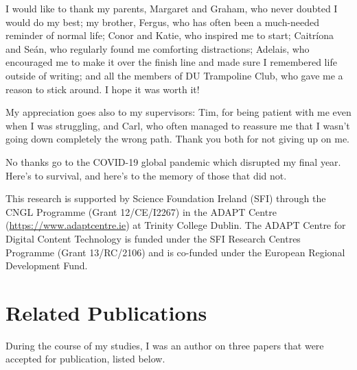 \documentclass[a4paper,12pt,leqno,twoside]{article}
\begin{document}
I would like to thank my parents, Margaret and Graham, who never doubted I would do my best; my brother, Fergus, who has often been a much-needed reminder of normal life; Conor and Katie, who inspired me to start; Caitr\'{i}ona and Se\'{a}n, who regularly found me comforting distractions; Adelais, who encouraged me to make it over the finish line and made sure I remembered life outside of writing; and all the members of DU Trampoline Club, who gave me a reason to stick around. I hope it was worth it!

My appreciation goes also to my supervisors: Tim, for being patient with me even when I was struggling, and Carl, who often managed to reassure me that I wasn't going down completely the wrong path. Thank you both for not giving up on me.

No thanks go to the COVID-19 global pandemic which disrupted my final year. Here's to survival, and here's to the memory of those that did not.

This research is supported by Science Foundation Ireland (SFI) through the CNGL 
Programme (Grant 12/CE/I2267) in the ADAPT Centre 
(\url{https://www.adaptcentre.ie}) at Trinity College Dublin. The
ADAPT Centre for Digital Content Technology is funded under the SFI Research 
Centres Programme (Grant 13/RC/2106) and is co-funded under the European 
Regional Development Fund.


\newpage
\section*{Related Publications}
During the course of my studies, I was an author on three papers that were accepted for publication, listed below.
\end{document}
